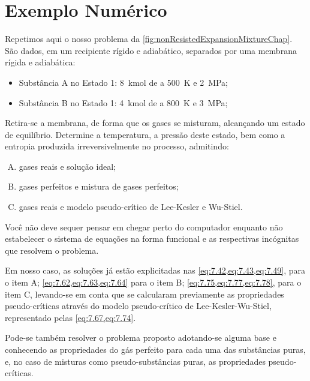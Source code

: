     \section{Exemplo Numérico}

    Repetimos aqui o nosso problema da
    \cref{fig:nonResistedExpansionMixtureChap}. São dados, em um recipiente
    rígido e adiabático, separados por uma membrana rígida e adiabática:

    \begin{itemize}
        \item Substância A no Estado 1: \SI{8}{\kilo\mol} de  a
            \SI{500}{\kelvin} e \SI{2}{\mega\pascal};

        \item Substância B no Estado 1: \SI{4}{\kilo\mol} de  a
            \SI{800}{\kelvin} e \SI{3}{\mega\pascal};
    \end{itemize}

    Retira-se a membrana, de forma que os gases se misturam, alcançando um
    estado de equilíbrio. Determine a temperatura, a pressão deste estado, bem
    como a entropia produzida irreversivelmente no processo, admitindo:

    \begin{enumerate}[(A)]
        \item gases reais e solução ideal;
        \item gases perfeitos e mistura de gases perfeitos;
        \item gases reais e modelo pseudo-crítico de Lee-Kesler e Wu-Stiel.
    \end{enumerate}

    Você não deve sequer pensar em chegar perto do computador enquanto não
    estabelecer o sistema de equações na forma funcional e as respectivas
    incógnitas que resolvem o problema.

    Em nosso caso, as soluções já estão explicitadas nas
    \cref{eq:7.42,eq:7.43,eq:7.49}, para o item A;
    \cref{eq:7.62,eq:7.63,eq:7.64} para o item B;
    \cref{eq:7.75,eq:7.77,eq:7.78}, para o item C, levando-se em conta que se
    calcularam previamente as propriedades pseudo-críticas através do modelo
    pseudo-crítico de Lee-Kesler-Wu-Stiel, representado pelas
    \cref{eq:7.67,eq:7.74}.

    Pode-se também resolver o problema proposto adotando-se alguma base e
    conhecendo as propriedades do gás perfeito para cada uma das substâncias
    puras, e, no caso de misturas como pseudo-substâncias puras, as
    propriedades pseudo-críticas.

